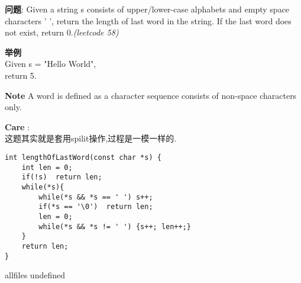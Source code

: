 \documentclass{article}
\begin{document}
\begin{CJK}{UTF8}{gbsn}     %

\else
    
\begin{description}
    \item{\textbf{问题}}: Given a string s consists of upper/lower-case alphabets and empty space characters ' ', return the length of last word in the string. If the last word does not exist, return 0.\textit{(leetcode 58)}
	\item{\textbf{举例}}\\
	Given s = "Hello World",\\
	return 5. 
	\item{\textbf{Note}} A word is defined as a character sequence consists of non-space characters only.
    \item{\textbf{Care}} : 
    \\这题其实就是套用spilit操作,过程是一模一样的.
    \begin{lstlisting}
int lengthOfLastWord(const char *s) {
	int len = 0;
	if(!s)	return len;
	while(*s){
		while(*s && *s == ' ') s++;
		if(*s == '\0')	return len;
		len = 0;
		while(*s && *s != ' ') {s++; len++;}
	}
	return len;
}
    \end{lstlisting}
\end{description}

\fi

\ifx allfiles undefined
\end{CJK}
\end{document}

